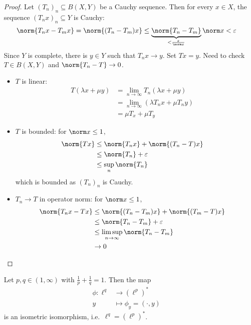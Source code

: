 \documentclass[a4paper]{article}
\begin{document}
\begin{proof}
  Let \((T_n)_n \subseteq B(X, Y)\) be a Cauchy sequence. Then for every \(x \in X\), the sequence \((T_nx)_n \subseteq Y\) is Cauchy:
  \[
    \norm{T_n x - T_mx}
    = \norm{(T_n - T_m) x}
    \leq \underbrace{\norm{T_n - T_m}}_{< \frac{\varepsilon}{\norm x}} \norm x
    < \varepsilon
  \]
  Since \(Y\) is complete, there is \(y \in Y\) such that \(T_nx \to y\). Set \(Tx = y\). Need to check \(T \in B(X, Y)\) and \(\norm{T_n - T} \to 0\).
  \begin{itemize}
  \item \(T\) is linear:
    \begin{align*}
      T(\lambda x + \mu y)
      &= \lim_{n \to \infty} T_n(\lambda x + \mu y) \\
      &= \lim_{n \to \infty} (\lambda T_n x + \mu T_n y) \\
      &= \mu T_x + \mu T_y
    \end{align*}
  \item \(T\) is bounded: for \(\norm x \leq 1\),
    \begin{align*}
      \norm{Tx}
      &\leq \norm{T_nx} + \norm{(T_n - T) x} \\
      &\leq \norm{T_n} + \varepsilon \\
      &\leq \sup_n \norm{T_n}
    \end{align*}
    which is bounded as \((T_n)_n\) is Cauchy.
  \item \(T_n \to T\) in operator norm: for \(\norm x \leq 1\),
    \begin{align*}
      \norm{T_n x - Tx}
      &\leq \norm{(T_n - T_m) x} + \norm{(T_m - T) x} \\
      &\leq \norm{T_n - T_m} + \varepsilon \\
      &\leq \limsup_{n \to \infty} \norm{T_n - T_m} \\
      &\to 0
    \end{align*}
  \end{itemize}
\end{proof}

\begin{eg}
  Let \(p, q \in (1, \infty)\) with \(\frac{1}{p} + \frac{1}{q} = 1\). Then the map
  \begin{align*}
    \phi: \ell^q &\to (\ell^p)^* \\
    y &\mapsto \phi_y = (\cdot, y)
  \end{align*}
  is an isometric isomorphism, i.e.\ \(\ell^q = (\ell^p)^*\).

\end{eg}
\end{document}
